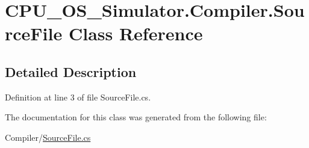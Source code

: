 \hypertarget{class_c_p_u___o_s___simulator_1_1_compiler_1_1_source_file}{}\section{C\+P\+U\+\_\+\+O\+S\+\_\+\+Simulator.\+Compiler.\+Source\+File Class Reference}
\label{class_c_p_u___o_s___simulator_1_1_compiler_1_1_source_file}


\subsection{Detailed Description}


Definition at line 3 of file Source\+File.\+cs.



The documentation for this class was generated from the following file\+:\begin{DoxyCompactItemize}
\item 
Compiler/\hyperlink{_source_file_8cs}{Source\+File.\+cs}\end{DoxyCompactItemize}

